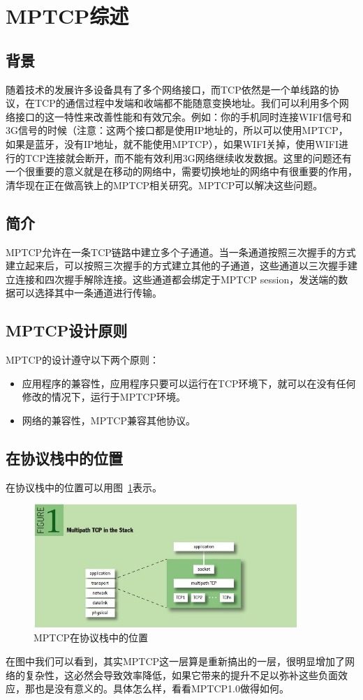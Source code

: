 \section{MPTCP综述}
\subsection{背景}
随着技术的发展许多设备具有了多个网络接口，而TCP依然是一个单线路的协议，在TCP的通信过程中发端和收端都不能随意变换地址。我们可以利用多个网络接口的这一特性来改善性能和有效冗余。例如：你的手机同时连接WIFI信号和3G信号的时候（注意：这两个接口都是使用IP地址的，所以可以使用MPTCP，如果是蓝牙，没有IP地址，就不能使用MPTCP），如果WIFI关掉，使用WIFI进行的TCP连接就会断开，而不能有效利用3G网络继续收发数据。这里的问题还有一个很重要的意义就是在移动的网络中，需要切换地址的网络中有很重要的作用，清华现在正在做高铁上的MPTCP相关研究。MPTCP可以解决这些问题。

\subsection{简介}
MPTCP允许在一条TCP链路中建立多个子通道。当一条通道按照三次握手的方式建立起来后，可以按照三次握手的方式建立其他的子通道，这些通道以三次握手建立连接和四次握手解除连接。这些通道都会绑定于MPTCP session，发送端的数据可以选择其中一条通道进行传输。

\subsection{MPTCP设计原则}
MPTCP的设计遵守以下两个原则：
\begin{itemize}
	\item 应用程序的兼容性，应用程序只要可以运行在TCP环境下，就可以在没有任何修改的情况下，运行于MPTCP环境。{\color{red}{可能应用程序也需要进行MPTCP改造}}
	\item 网络的兼容性，MPTCP兼容其他协议。{\color{red}{我覺得MPTCP就是给TCP加了一层，所以所谓的兼容其他的协议，只是兼容TCP而已，因为它只使用TCP子流}}
\end{itemize}

\subsection{在协议栈中的位置}
在协议栈中的位置可以用图~\ref{label:MPTCP在协议栈中的位置}表示。
\begin{figure}[H]
	\centering
	\includegraphics[width=10cm]{dias/MPTCP_position_in_protocol_stack.jpg}
	\caption{MPTCP在协议栈中的位置}
	\label{label:MPTCP在协议栈中的位置}
\end{figure}
在图中我们可以看到，其实MPTCP这一层算是重新搞出的一层，很明显增加了网络的复杂性，这必然会导致效率降低，如果它带来的提升不足以弥补这些负面效应，那也是没有意义的。具体怎么样，看看MPTCP1.0做得如何。